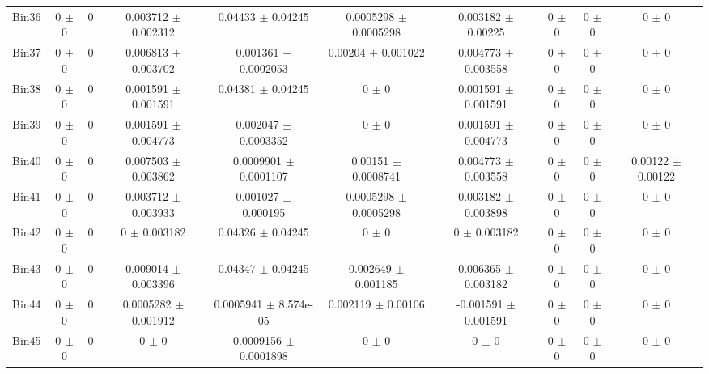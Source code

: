 \begin{tabular}{@{\extracolsep{4pt}}lccccccccc@{}}
     Bin36 & 0 $\pm$ 0 & 0 & 0.003712 $\pm$ 0.002312 & 0.04433 $\pm$ 0.04245 & 0.0005298 $\pm$ 0.0005298 & 0.003182 $\pm$ 0.00225 & 0 $\pm$ 0 & 0 $\pm$ 0 & 0 $\pm$ 0 \\ 
     Bin37 & 0 $\pm$ 0 & 0 & 0.006813 $\pm$ 0.003702 & 0.001361 $\pm$ 0.0002053 & 0.00204 $\pm$ 0.001022 & 0.004773 $\pm$ 0.003558 & 0 $\pm$ 0 & 0 $\pm$ 0 & 0 $\pm$ 0 \\ 
     Bin38 & 0 $\pm$ 0 & 0 & 0.001591 $\pm$ 0.001591 & 0.04381 $\pm$ 0.04245 & 0 $\pm$ 0 & 0.001591 $\pm$ 0.001591 & 0 $\pm$ 0 & 0 $\pm$ 0 & 0 $\pm$ 0 \\ 
     Bin39 & 0 $\pm$ 0 & 0 & 0.001591 $\pm$ 0.004773 & 0.002047 $\pm$ 0.0003352 & 0 $\pm$ 0 & 0.001591 $\pm$ 0.004773 & 0 $\pm$ 0 & 0 $\pm$ 0 & 0 $\pm$ 0 \\ 
     Bin40 & 0 $\pm$ 0 & 0 & 0.007503 $\pm$ 0.003862 & 0.0009901 $\pm$ 0.0001107 & 0.00151 $\pm$ 0.0008741 & 0.004773 $\pm$ 0.003558 & 0 $\pm$ 0 & 0 $\pm$ 0 & 0.00122 $\pm$ 0.00122 \\ 
     Bin41 & 0 $\pm$ 0 & 0 & 0.003712 $\pm$ 0.003933 & 0.001027 $\pm$ 0.000195 & 0.0005298 $\pm$ 0.0005298 & 0.003182 $\pm$ 0.003898 & 0 $\pm$ 0 & 0 $\pm$ 0 & 0 $\pm$ 0 \\ 
     Bin42 & 0 $\pm$ 0 & 0 & 0 $\pm$ 0.003182 & 0.04326 $\pm$ 0.04245 & 0 $\pm$ 0 & 0 $\pm$ 0.003182 & 0 $\pm$ 0 & 0 $\pm$ 0 & 0 $\pm$ 0 \\ 
     Bin43 & 0 $\pm$ 0 & 0 & 0.009014 $\pm$ 0.003396 & 0.04347 $\pm$ 0.04245 & 0.002649 $\pm$ 0.001185 & 0.006365 $\pm$ 0.003182 & 0 $\pm$ 0 & 0 $\pm$ 0 & 0 $\pm$ 0 \\ 
     Bin44 & 0 $\pm$ 0 & 0 & 0.0005282 $\pm$ 0.001912 & 0.0005941 $\pm$ 8.574e-05 & 0.002119 $\pm$ 0.00106 & -0.001591 $\pm$ 0.001591 & 0 $\pm$ 0 & 0 $\pm$ 0 & 0 $\pm$ 0 \\ 
     Bin45 & 0 $\pm$ 0 & 0 & 0 $\pm$ 0 & 0.0009156 $\pm$ 0.0001898 & 0 $\pm$ 0 & 0 $\pm$ 0 & 0 $\pm$ 0 & 0 $\pm$ 0 & 0 $\pm$ 0 \\ 
\hline\hline
  \end{tabular}
